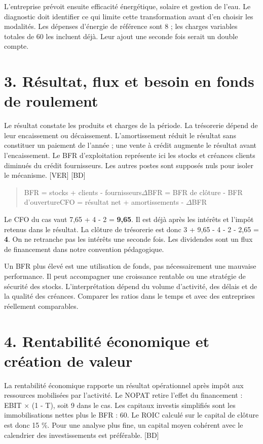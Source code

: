 \documentclass[12pt,a4paper]{article}
\begin{document}
L’entreprise prévoit ensuite efficacité énergétique, solaire et gestion de l’eau. Le diagnostic doit identifier ce qui limite cette transformation avant d’en choisir les modalités. Les dépenses d’énergie de référence sont 8 ; les charges variables totales de 60 les incluent déjà. Leur ajout une seconde fois serait un double compte.

\section*{3. Résultat, flux et besoin en fonds de roulement}
Le résultat constate les produits et charges de la période. La trésorerie dépend de leur encaissement ou décaissement. L’amortissement réduit le résultat sans constituer un paiement de l’année ; une vente à crédit augmente le résultat avant l’encaissement. Le BFR d’exploitation représente ici les stocks et créances clients diminués du crédit fournisseurs. Les autres postes sont supposés nuls pour isoler le mécanisme. [VER] [BD]



\begin{quote}\small BFR = stocks + clients - fournisseurs\newline $\Delta$BFR = BFR de clôture - BFR d’ouverture\newline CFO = résultat net + amortissements - $\Delta$BFR\end{quote}

Le CFO du cas vaut 7,65 + 4 - 2 = \textbf{9,65}. Il est déjà après les intérêts et l’impôt retenus dans le résultat. La clôture de trésorerie est donc 3 + 9,65 - 4 - 2 - 2,65 = \textbf{4}. On ne retranche pas les intérêts une seconde fois. Les dividendes sont un flux de financement dans notre convention pédagogique.


Un BFR plus élevé est une utilisation de fonds, pas nécessairement une mauvaise performance. Il peut accompagner une croissance rentable ou une stratégie de sécurité des stocks. L’interprétation dépend du volume d’activité, des délais et de la qualité des créances. Comparer les ratios dans le temps et avec des entreprises réellement comparables.

\section*{4. Rentabilité économique et création de valeur}
La rentabilité économique rapporte un résultat opérationnel après impôt aux ressources mobilisées par l’activité. Le NOPAT retire l’effet du financement : EBIT $\times$ (1 - T), soit 9 dans le cas. Les capitaux investis simplifiés sont les immobilisations nettes plus le BFR : 60. Le ROIC calculé sur le capital de clôture est donc 15 \%. Pour une analyse plus fine, un capital moyen cohérent avec le calendrier des investissements est préférable. [BD]
\end{document}
